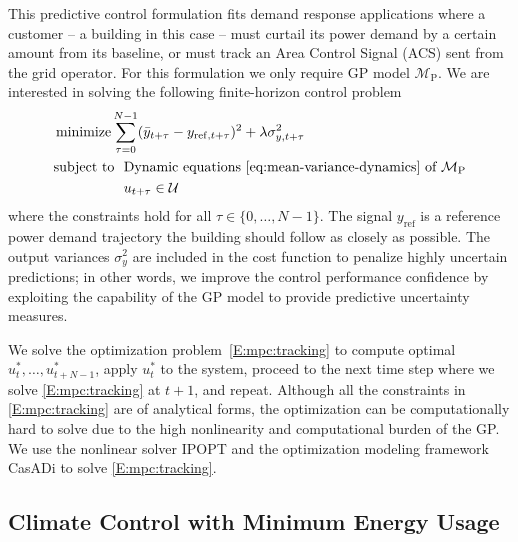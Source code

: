 This predictive control formulation fits demand response applications where a customer -- a building in this case -- must curtail its power demand by a certain amount from its baseline, or must track an Area Control Signal (ACS) sent from the grid operator.
For this formulation we only require GP model \(\mathcal{M}_{\mathrm{P}}\).
We are interested in solving the following finite-horizon control problem
\begin{align}
  &\operatorname*{minimize} \sum_{\tau=0}^{N-1} (\bar{y}_{t+\tau} - y_{\mathrm{ref},t+\tau})^2 + \lambda \sigma^2_{y,t+\tau} \label{E:mpc:tracking} \\
  & 
    \begin{aligned}
      \text{subject to}\ \  & \text{Dynamic equations \eqref{eq:mean-variance-dynamics} of $\mathcal{M}_{\mathrm{P}}$} \\
      & u_{t+\tau} \in \mathcal{U} \nonumber 
    \end{aligned}
\end{align}
where the constraints hold for all \(\tau \in \{0,\dots,N-1\}\).
The signal $y_{\mathrm{ref}}$ is a reference power demand trajectory the building should follow as closely as possible.
The output variances $\sigma^{2}_{y}$ are included in the cost function to penalize highly uncertain predictions; in other words, we improve the control performance confidence by exploiting the capability of the GP model to provide predictive uncertainty measures.

We solve the optimization problem~\eqref{E:mpc:tracking} to compute optimal \(u_{t}^*, \dots, u_{t+N-1}^*\), apply \(u_{t}^*\) to the system, proceed to the next time step where we solve \eqref{E:mpc:tracking} at \(t+1\), and repeat.
Although all the constraints in \eqref{E:mpc:tracking} are of analytical forms, the optimization can be computationally hard to solve due to the high nonlinearity and computational burden of the GP.
We use the nonlinear solver IPOPT \cite{Waechter2009b} and the optimization modeling framework CasADi \cite{Andersson2013b} to solve \eqref{E:mpc:tracking}.


\subsection{Climate Control with Minimum Energy Usage}


